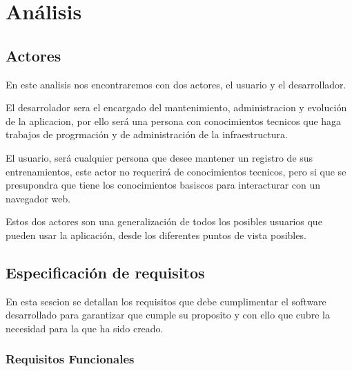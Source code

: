 \chapter{Análisis}

\section {Actores}
En este analisis nos encontraremos con dos actores, el usuario y el desarrollador.

El desarrolador sera el encargado del mantenimiento, administracion y evolución de la aplicacion, por ello será una persona con conocimientos tecnicos que haga trabajos de progrmación y de administración de la infraestructura.

El usuario, será cualquier persona que desee mantener un registro de sus entrenamientos, este actor no requerirá de conocimientos tecnicos, pero si que se presupondra que tiene los conocimientos basiscos para interacturar con un navegador web.

Estos dos actores son una generalización de todos los posibles usuarios que pueden usar la aplicación, desde los diferentes puntos de vista posibles.

\section{Especificación de requisitos}

En esta sescion se detallan los requisitos que debe cumplimentar el software desarrollado para garantizar que cumple su proposito y con ello que cubre la necesidad para la que ha sido creado.

\subsection{Requisitos Funcionales}

